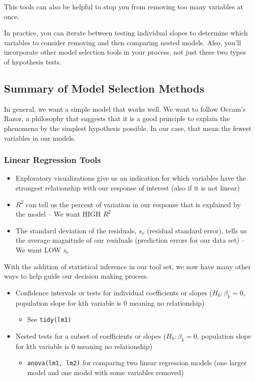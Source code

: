 \documentclass[
]{book}
\providecommand{\tightlist}{%
  \setlength{\itemsep}{0pt}\setlength{\parskip}{0pt}}
\begin{document}
This tools can also be helpful to stop you from removing too many variables at once.

In practice, you can iterate between testing individual slopes to determine which variables to consider removing and then comparing nested models. Also, you'll incorporate other model selection tools in your process, not just these two types of hypothesis tests.

\subsection{Summary of Model Selection Methods}\label{summary-of-model-selection-methods}

In general, we want a simple model that works well. We want to follow Occam's Razor, a philosophy that suggests that it is a good principle to explain the phenomena by the simplest hypothesis possible. In our case, that mean the fewest variables in our models.

\subsubsection{Linear Regression Tools}\label{linear-regression-tools}

\begin{itemize}
\tightlist
\item
  Exploratory visualizations give us an indication for which variables have the strongest relationship with our response of interest (also if it is not linear)
\item
  \(R^2\) can tell us the percent of variation in our response that is explained by the model -- We want HIGH \(R^2\)
\item
  The standard deviation of the residuals, \(s_e\) (residual standard error), tells us the average magnitude of our residuals (prediction errors for our data set) -- We want LOW \(s_e\)
\end{itemize}

With the addition of statistical inference in our tool set, we now have many other ways to help guide our decision making process.

\begin{itemize}
\tightlist
\item
  Confidence intervals or tests for individual coefficients or slopes (\(H_0: \beta_k = 0\), population slope for kth variable is 0 meaning no relationship)

  \begin{itemize}
  \tightlist
  \item
    See \texttt{tidy(lm1)}
  \end{itemize}
\item
  Nested tests for a subset of coefficients or slopes (\(H_0: \beta_k = 0\), population slope for kth variable is 0 meaning no relationship)

  \begin{itemize}
  \tightlist
  \item
    \texttt{anova(lm1,\ lm2)} for comparing two linear regression models (one larger model and one model with some variables removed)
  \end{itemize}
\end{itemize}
\end{document}
